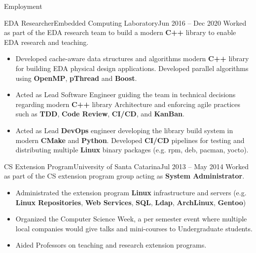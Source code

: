 \documentclass[calibri]{mcdowellcv}
\begin{document}
\begin{cvsection}{Employment}
		\begin{cvsubsection}{EDA Researcher}{Embedded Computing Laboratory}{Jun 2016 -- Dec 2020}
			Worked as part of the EDA research team to build a modern \textbf{C++} library to enable EDA research and teaching.
			\begin{itemize}
				\item Developed cache-aware data structures and algorithms modern \textbf{C++} library for building EDA physical design applications. Developed parallel algorithms using \textbf{OpenMP}, \textbf{pThread} and \textbf{Boost}.
				\item Acted as Lead Software Engineer guiding the team in technical decisions regarding modern \textbf{C++} library Architecture and enforcing agile practices such as \textbf{TDD}, \textbf{Code Review}, \textbf{CI/CD}, and \textbf{KanBan}.
				\item Acted as Lead \textbf{DevOps} engineer developing the library build system in modern \textbf{CMake} and \textbf{Python}. Developed \textbf{CI/CD} pipelines for testing and distributing multiple \textbf{Linux} binary packages (e.g. rpm, deb, pacman, yocto).
			\end{itemize}
		\end{cvsubsection}

		\begin{cvsubsection}{CS Extension Program}{University of Santa Catarina}{Jul 2013 -- May 2014}
			Worked as part of the CS extension program group acting as \textbf{System Administrator}.
			\begin{itemize}
				\item Administrated the extension program \textbf{Linux} infrastructure and servers (e.g. \textbf{Linux Repositories}, \textbf{Web Services}, \textbf{SQL}, \textbf{Ldap}, \textbf{ArchLinux}, \textbf{Gentoo})
				\item Organized the Computer Science Week, a per semester event where multiple local companies would give talks and mini-courses to Undergraduate students.
				\item Aided Professors on teaching and research extension programs.
			\end{itemize}
		\end{cvsubsection}
	\end{cvsection}
\end{document}
